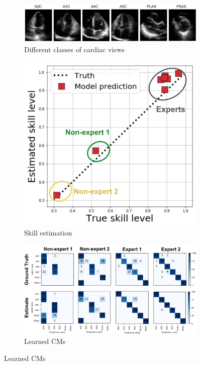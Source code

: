 \label{sec:us_experiments}
\begin{figure}[h]
% 	
	\center
	\begin{subfigure}[]{\linewidth}
		\caption{Different classes of cardiac views}
    	\vspace{-3mm}	
		\includegraphics[width=\linewidth]{chapter_4/figures/figure_cardiac_views_02.png}
	\end{subfigure}
	\hspace{30mm}
	\hfill
	\begin{subfigure}[]{0.45\linewidth}
    	\vspace{3mm}
		\caption{Skill estimation}
    	\vspace{-3mm}		
		\includegraphics[width=0.9\linewidth]{chapter_4/figures/figure_real_us_annotator_clustering_03.png}
	\end{subfigure}
	\hspace{0mm}
	\begin{subfigure}[]{0.75\linewidth}
    	\vspace{3mm}
		 \caption{Learned CMs}
    	\vspace{-3mm}
		\includegraphics[width=\linewidth]{chapter_4/figures/figure_real_us_cms_visualization_02.png}
	\end{subfigure}


\end{figure}
